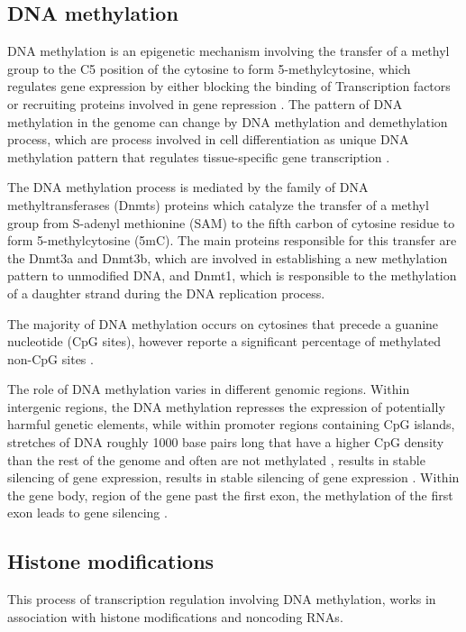 \subsection{DNA methylation}
DNA methylation is an epigenetic mechanism involving the transfer of a methyl group to the C5
position of the cytosine to form 5-methylcytosine, which regulates
gene expression  by either blocking the binding of Transcription factors or
recruiting proteins involved in gene repression \cite{moore2013dna}.
The pattern of DNA methylation in the genome can change by DNA methylation and demethylation process,
which  are process involved in cell differentiation as unique DNA methylation pattern that regulates
tissue-specific gene transcription \cite{moore2013dna}.

The DNA methylation process is mediated by the family of DNA methyltransferases (Dnmts)
proteins which catalyze the transfer of a methyl group from S-adenyl methionine (SAM) to the fifth carbon of cytosine residue to form 5-methylcytosine (5mC).
The main proteins responsible for this transfer are the Dnmt3a and Dnmt3b, which
are involved in establishing a new methylation pattern to unmodified DNA, and Dnmt1, which is responsible
to the methylation of a daughter strand during the DNA replication process.

The majority of DNA methylation occurs on cytosines that precede a guanine nucleotide (CpG sites), however
 reporte a significant percentage of methylated non-CpG sites \cite{xie2012base}.

The role of DNA methylation varies in different genomic regions.
Within intergenic regions, the DNA methylation represses the expression of potentially harmful genetic elements,
while within promoter regions containing CpG islands, stretches of DNA roughly 1000 base pairs long that have a higher CpG density than the rest of the genome and  often  are not methylated  \cite{bird1985fraction}, results in stable silencing of gene expression, results in stable silencing of gene expression \cite{mohn2008lineage}.
Within the gene body, region of the gene past the first exon, the methylation of the first exon leads to gene silencing
\cite{brenet2011dna}.


\subsection{Histone modifications}

This process of transcription regulation involving DNA methylation,
works in association with histone modifications and noncoding RNAs.

